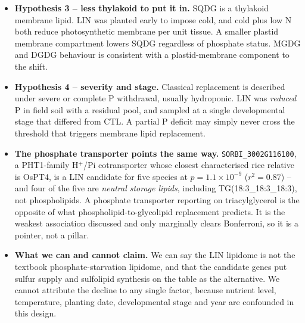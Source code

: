 \documentclass[11pt]{article}
\newcommand{\lead}[1]{\textbf{#1}}
\begin{document}
\begin{itemize}
  \item \lead{Hypothesis 3 -- less thylakoid to put it in.} SQDG is a thylakoid
        membrane lipid. LIN was planted early to impose cold, and cold plus low N
        both reduce photosynthetic membrane per unit tissue. A smaller plastid
        membrane compartment lowers SQDG regardless of phosphate status. MGDG and
        DGDG behaviour is consistent with a plastid-membrane component to the
        shift.
  \item \lead{Hypothesis 4 -- severity and stage.} Classical replacement is
        described under severe or complete P withdrawal, usually hydroponic. LIN
        was \emph{reduced} P in field soil with a residual pool, and sampled at a
        single developmental stage that differed from CTL. A partial P deficit may
        simply never cross the threshold that triggers membrane lipid replacement.
  \item \lead{The phosphate transporter points the same way.}
        \texttt{SORBI\_3002G116100}, a PHT1-family H$^{+}$/Pi cotransporter whose
        closest characterised rice relative is OsPT4, is a LIN candidate for five
        species at $p=1.1\times10^{-9}$ ($r^2=0.87$) -- and four of the five are
        \emph{neutral storage lipids}, including TG(18:3\_18:3\_18:3), not
        phospholipids. A phosphate transporter reporting on triacylglycerol is
        the opposite of what phospholipid-to-glycolipid replacement predicts. It
        is the weakest association discussed and only marginally clears
        Bonferroni, so it is a pointer, not a pillar.
  \item \lead{What we can and cannot claim.} We can say the LIN lipidome is not
        the textbook phosphate-starvation lipidome, and that the candidate genes
        put sulfur supply and sulfolipid synthesis on the table as the
        alternative. We cannot attribute the decline to any single factor,
        because nutrient level, temperature, planting date, developmental stage
        and year are confounded in this design.
\end{itemize}
\end{document}
